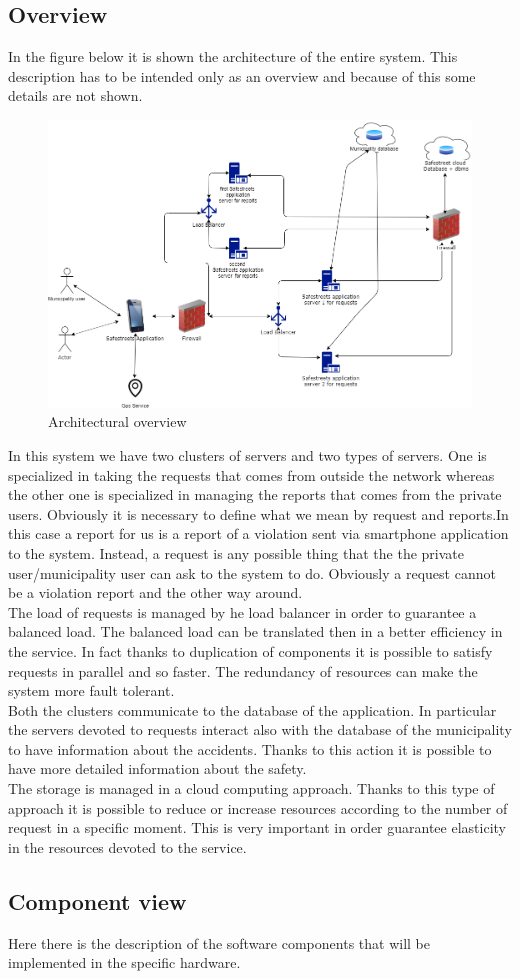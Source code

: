 \documentclass[titlepage]{article}
\begin{document}
\subsection{Overview}
In the figure below it is shown the architecture of the entire system. This description has to be intended only as an overview and because of this some details are not shown.
\begin{figure}[h]
	\includegraphics[scale=0.465]{Diagrams/overview.png}
	\caption{Architectural overview}
\end{figure}
\FloatBarrier In this system we have two clusters of servers and two types of servers. One is specialized in taking the requests that comes from outside the network whereas the other one is specialized in managing the reports that comes from the private users. Obviously it is necessary to define what we mean by request and reports.In this case a report for us is a report of a violation sent via smartphone application to the system. Instead, a request is any possible thing that the the private user/municipality user can ask to the system to do. Obviously a request cannot be a violation report and the other way around.\\
 The load of requests is managed by  he load balancer in order to guarantee a balanced load. The balanced load can be translated then in a better efficiency in the service. In fact thanks to duplication of components it is possible to satisfy requests in parallel and so faster. The redundancy of resources can make the system more fault tolerant.\\
 Both the clusters communicate to the database of the application. In particular the servers devoted to requests interact also with the database of the municipality to have information about the accidents. Thanks to this action it is possible to have more detailed information about the safety.\\
The storage is managed in a cloud computing approach. Thanks to this type of approach it is possible to reduce or increase resources according to the number of request in a specific moment. This is very important in order guarantee elasticity in the resources devoted to the service.\\ 

\subsection{Component view}
Here there is the description of the software components that will be implemented in the specific hardware. 
\end{document}
